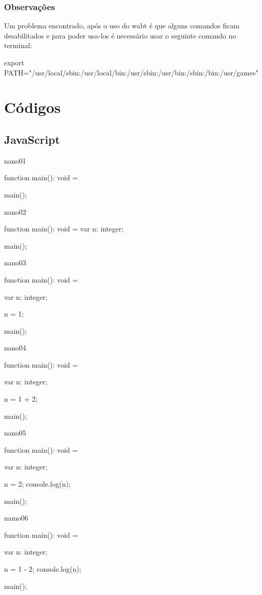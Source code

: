 \documentclass[12pt,a4paper,twoside]{article}
\begin{document}
\subsubsection{Observações}
Um problema encontrado, após o uso do wabt é que alguns comandos ficam desabilitados e para poder usa-los é necessário usar o seguinte comando no terminal:
\begin{terminal}
 export PATH="/usr/local/sbin:/usr/local/bin:/usr/sbin:/usr/bin:/sbin:/bin:/usr/games"
\end{terminal}

\newpage

\section{Códigos}
\subsection{JavaScript}
nano01
\begin{terminal}
    function main(): void = {
    }
    
    main();
\end{terminal}
nano02
\begin{terminal}
    function main(): void = {
        var n: integer;
    }
    
    main();
\end{terminal}
nano03
\begin{terminal}
    function main(): void = {
        var n: integer;
        
        n = 1;
    }
    
    main();
\end{terminal}
nano04
\begin{terminal}
    function main(): void = {
        var n: integer;
        
        n = 1 + 2;
    }
    
    main();
\end{terminal}
nano05
\begin{terminal}
    function main(): void = {
        var n: integer;
        
        n = 2;
        console.log(n);
    }
    
    main();
\end{terminal}
namo06
\begin{terminal}
    function main(): void = {
        var n: integer;
        
        n = 1 - 2;
        console.log(n);
    }
    
    main();
\end{terminal}
\end{document}
